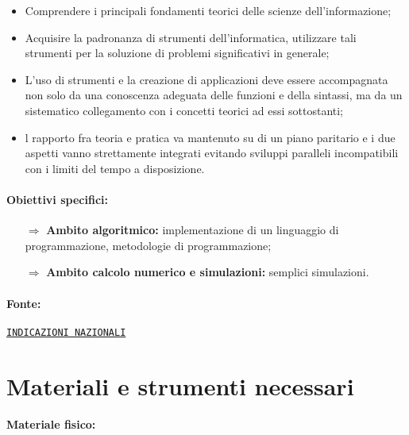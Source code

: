 \begin{itemize}
    \item Comprendere i principali
    fondamenti teorici delle scienze dell’informazione;
    \item Acquisire la padronanza di strumenti
    dell’informatica, utilizzare tali strumenti per la soluzione di problemi significativi in generale;
    \item L'uso di strumenti e la creazione di applicazioni deve essere accompagnata non solo da una
    conoscenza adeguata delle funzioni e della sintassi, ma da un sistematico collegamento con i
    concetti teorici ad essi sottostanti;
    \item l rapporto fra teoria e pratica va mantenuto
    su di un piano paritario e i due aspetti vanno strettamente integrati evitando sviluppi paralleli
    incompatibili con i limiti del tempo a disposizione.
\end{itemize}

\paragraph{Obiettivi specifici:}

\begin{itemize}
    \item [$\Rightarrow$] \textbf{Ambito algoritmico:}  implementazione di un linguaggio di programmazione, metodologie di programmazione;
    \item [$\Rightarrow$] \textbf{Ambito calcolo numerico e simulazioni:} semplici simulazioni.
\end{itemize}

\paragraph{Fonte:} \href{https://www.istruzione.it/alternanza/allegati/NORMATIVA%20ASL/INDICAZIONI%20NAZIONALI%20PER%20I%20LICEI.pdf}{\texttt{INDICAZIONI NAZIONALI}}

\pagebreak

\section{Materiali e strumenti necessari}

\paragraph{Materiale fisico:}

